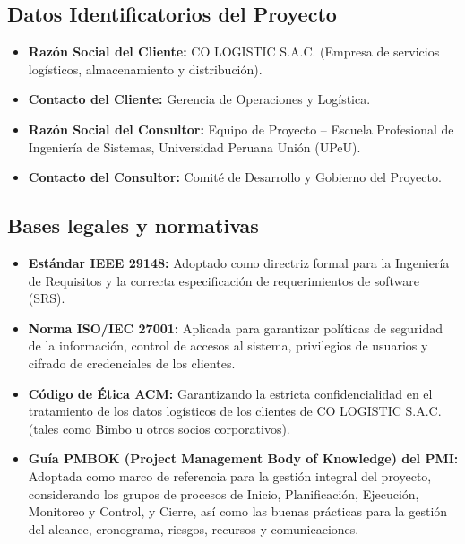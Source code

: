 \documentclass[11pt, a4paper, oneside]{report}
\begin{document}
\subsection{Datos Identificatorios del Proyecto}

\begin{itemize}

    \item \textbf{Razón Social del Cliente:}
    CO LOGISTIC S.A.C. (Empresa de servicios logísticos, almacenamiento y
    distribución).

    \item \textbf{Contacto del Cliente:}
    Gerencia de Operaciones y Logística.

    \item \textbf{Razón Social del Consultor:}
    Equipo de Proyecto -- Escuela Profesional de Ingeniería de Sistemas,
    Universidad Peruana Unión (UPeU).

    \item \textbf{Contacto del Consultor:}
    Comité de Desarrollo y Gobierno del Proyecto.

\end{itemize}

\subsection{Bases legales y normativas}

\begin{itemize}

    \item \textbf{Estándar IEEE 29148:}
    Adoptado como directriz formal para la Ingeniería de Requisitos y la correcta especificación de requerimientos de software (SRS).

    \item \textbf{Norma ISO/IEC 27001:}
    Aplicada para garantizar políticas de seguridad de la información, control de accesos al sistema, privilegios de usuarios y cifrado de credenciales de los clientes.

    \item \textbf{Código de Ética ACM:}
    Garantizando la estricta confidencialidad en el tratamiento de los datos logísticos de los clientes de CO LOGISTIC S.A.C. (tales como Bimbo u otros socios corporativos).

    \item \textbf{Guía PMBOK (Project Management Body of Knowledge) del PMI:}
    Adoptada como marco de referencia para la gestión integral del proyecto, considerando los grupos de procesos de Inicio, Planificación, Ejecución, Monitoreo y Control, y Cierre, así como las buenas prácticas para la gestión del alcance, cronograma, riesgos, recursos y comunicaciones.

\end{itemize}
\end{document}
